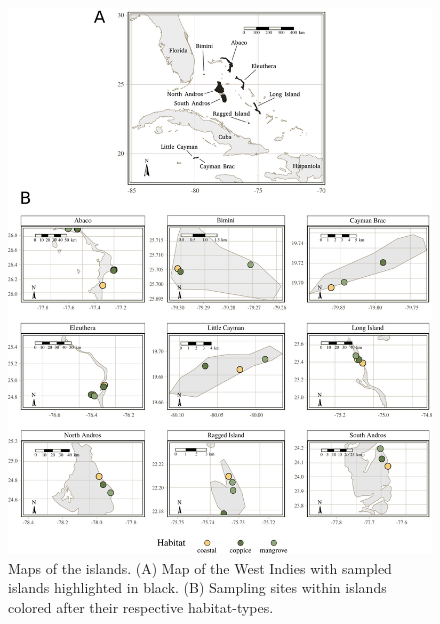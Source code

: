 \begin{figure}[H]
	\centering
	\includegraphics[width=\textwidth]{figures/island_maps_white_2.0.png}
	\caption{Maps of the islands. (A) Map of the West Indies with sampled islands highlighted in black. (B) Sampling sites within islands colored after their respective habitat-types.}
	\label{fig:maps}
\end{figure}

